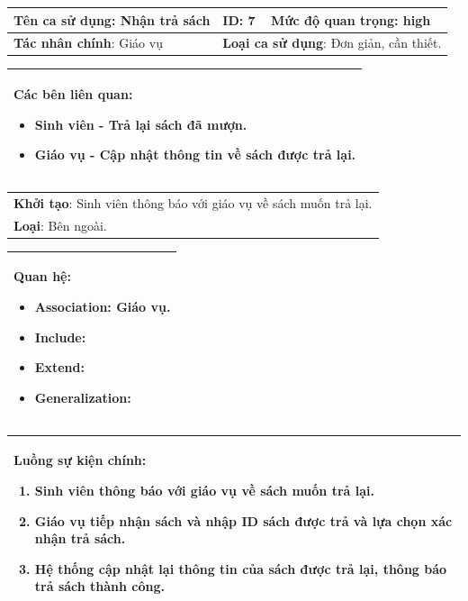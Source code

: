\documentclass[../report.tex]{subfiles}
\begin{document}
\begin{center}
\newpage
\begin{tabular}{| m{6cm} | m{3cm} | m{6cm} |}
    \hline
    \textbf{Tên ca sử dụng}: Nhận trả sách & \textbf{ID}: 7 & \textbf{Mức độ quan trọng}: high \\
    \hline
    \textbf{Tác nhân chính}: Giáo vụ  & \multicolumn{2}{|l|}{\textbf{Loại ca sử dụng}: Đơn giản, cần thiết.} \\
    \hline
\end{tabular}
\begin{tabular}{| m{15.9cm} |}
    \hline
        \textbf{Các bên liên quan:} 
        \begin{itemize}
            \item Sinh viên - Trả lại sách đã mượn. 
            \item Giáo vụ - Cập nhật thông tin về sách được trả lại. 
        \end{itemize} \\
    \hline
\end{tabular}

\begin{tabular}{| m{15.9cm} |}
    \hline
    \textbf{Khởi tạo}: Sinh viên thông báo với giáo vụ về sách muốn trả lại. \\
    \textbf{Loại}: Bên ngoài.  \\
    \hline
\end{tabular}

\begin{tabular}{| m{15.9cm} |}
    \hline
    \textbf{Quan hệ}:
    \begin{itemize}
        \item Association: Giáo vụ. 
        \item Include: 
        \item Extend: 
        \item Generalization: 
    \end{itemize} \\
    \hline
\end{tabular}

\begin{tabular}{| m{15.9cm} |}
    \hline
    \textbf{Luồng sự kiện chính}:
    \begin{enumerate}
        \item Sinh viên thông báo với giáo vụ về sách muốn trả lại. 
        \item Giáo vụ tiếp nhận sách và nhập ID sách được trả và lựa chọn xác nhận trả sách. 
        \item Hệ thống cập nhật lại thông tin của sách được trả lại, thông báo trả sách thành công. 
    \end{enumerate} \\
    \hline
\end{tabular}


\end{center}
\end{document}
